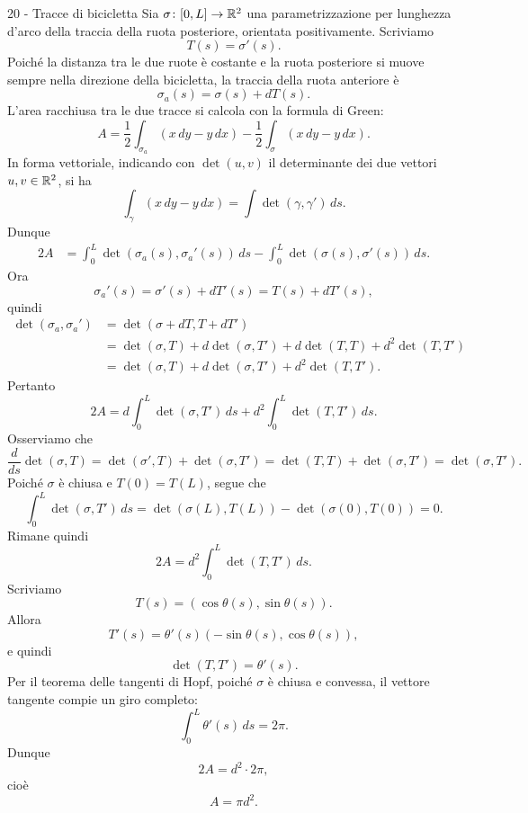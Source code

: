 \documentclass[a4paper]{article}
\begin{document}
\begin{snippetsolution}{20 - Tracce di bicicletta}
    Sia \(\sigma\colon[0,L]\to\mathbb{R}^2\)
    una parametrizzazione per lunghezza d'arco della traccia della ruota posteriore, orientata positivamente. Scriviamo
    \[
        T(s)=\sigma'(s).
    \]
    Poiché la distanza tra le due ruote è costante e la ruota posteriore si muove sempre nella direzione della bicicletta, la traccia della ruota anteriore è
    \[
        \sigma_a(s)=\sigma(s)+dT(s).
    \]
    L'area racchiusa tra le due tracce si calcola con la formula di Green:
    \[
        A=\frac12\int_{\sigma_a}(x\,dy-y\,dx)-\frac12\int_{\sigma}(x\,dy-y\,dx).
    \]
    In forma vettoriale, indicando con \(\det(u,v)\) il determinante dei due vettori \(u,v\in\mathbb{R}^2\), si ha
    \[
        \int_{\gamma}(x\,dy-y\,dx)=\int \det(\gamma,\gamma')\,ds.
    \]
    Dunque
    \begin{align*}
        2A
        &=
        \int_0^L \det(\sigma_a(s),\sigma_a'(s))\,ds
        -
        \int_0^L \det(\sigma(s),\sigma'(s))\,ds.
    \end{align*}
    Ora
    \[
        \sigma_a'(s)=\sigma'(s)+dT'(s)=T(s)+dT'(s),
    \]
    quindi
    \begin{align*}
        \det(\sigma_a,\sigma_a')
        &=
        \det(\sigma+dT,T+dT')\\
        &=
        \det(\sigma,T)+d\det(\sigma,T')+d\det(T,T)+d^2\det(T,T')\\
        &=
        \det(\sigma,T)+d\det(\sigma,T')+d^2\det(T,T').
    \end{align*}
    Pertanto
    \[
        2A
        =
        d\int_0^L \det(\sigma,T')\,ds
        +
        d^2\int_0^L \det(T,T')\,ds.
    \]
    Osserviamo che
    \[
        \frac{d}{ds}\det(\sigma,T)
        =
        \det(\sigma',T)+\det(\sigma,T')
        =
        \det(T,T)+\det(\sigma,T')
        =
        \det(\sigma,T').
    \]
    Poiché \(\sigma\) è chiusa e \(T(0)=T(L)\), segue che
    \[
        \int_0^L \det(\sigma,T')\,ds
        =
        \det(\sigma(L),T(L))-\det(\sigma(0),T(0))
        =
        0.
    \]
    Rimane quindi
    \[
        2A=d^2\int_0^L \det(T,T')\,ds.
    \]
    Scriviamo
    \[
        T(s)=(\cos\theta(s),\sin\theta(s)).
    \]
    Allora
    \[
        T'(s)=\theta'(s)(-\sin\theta(s),\cos\theta(s)),
    \]
    e quindi
    \[
        \det(T,T')=\theta'(s).
    \]
    Per il teorema delle tangenti di Hopf, poiché \(\sigma\) è chiusa e convessa, il vettore tangente compie un giro completo:
    \[
        \int_0^L \theta'(s)\,ds=2\pi.
    \]
    Dunque
    \[
        2A=d^2\cdot 2\pi,
    \]
    cioè
    \[
        A=\pi d^2.
    \]
\end{snippetsolution}
\end{document}
